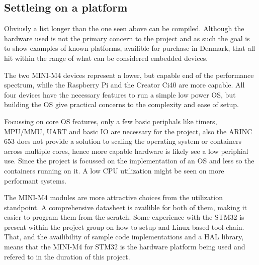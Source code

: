 \subsection{Settleing on a platform}
Obviusly a list longer than the one seen above can be compiled.
Although the hardware used is not the primary concern to the project
and as such the goal is to show examples of known platforms,
availible for purchase in Denmark,
that all hit within the range of what can be considered embedded devices.

The two MINI-M4 devices represent a lower, but capable end of the performance spectrum,
while the Raspberry Pi and the Creator Ci40 are more capable.
All four devices have the necessary features to run a simple low power OS,
but building the OS give practical concerns to the complexity and ease of setup.

Focussing on core OS features, only a few basic periphals
like timers, MPU/MMU, UART and basic IO are necessary for the project,
also the ARINC 653 does not provide a solution to scaling the operating system
or containers across multiple cores,
hence more capable hardware is likely see a low periphial use.
Since the project is focussed on the implementation of an OS
and less so the containers running on it.
A low CPU utilization might be seen on more performant systems.

The MINI-M4 modules are more attractive choices from the utilization standpoint.
A comprehensive datasheet is availible for both of them,
making it easier to program them from the scratch.
Some experience with the STM32 is present within the project group
on how to setup and Linux based tool-chain.
That, and the availibility of sample code implementations and a HAL library,
means that the MINI-M4 for STM32 is the hardware platform being used and refered to
in the duration of this project.

\section{}
